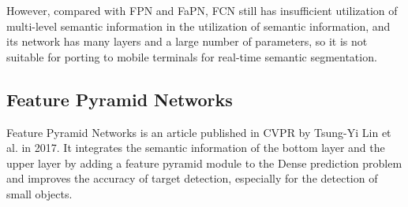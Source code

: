 However, compared with FPN and FaPN, FCN still has insufficient utilization of multi-level semantic information in the utilization of semantic information, and its network has many layers and a large number of parameters, so it is not suitable for porting to mobile terminals for real-time semantic segmentation.


\subsection{Feature Pyramid Networks}
Feature Pyramid Networks \cite{lin2017feature} is an article published in CVPR by Tsung-Yi Lin et al. in 2017. It integrates the semantic information of the bottom layer and the upper layer by adding a feature pyramid module to the Dense prediction problem and improves the accuracy of target detection, especially for the detection of small objects.

